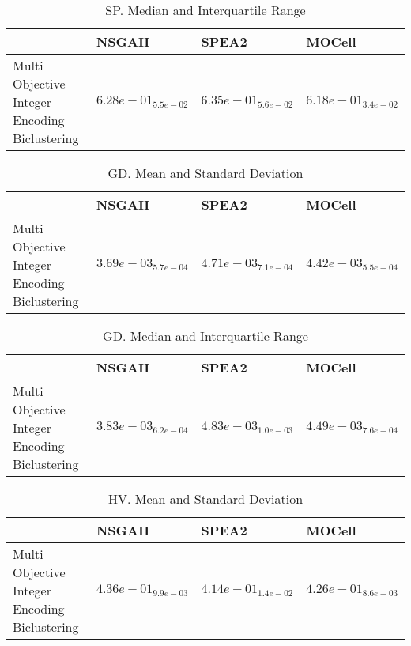 \documentclass{article}
\begin{document}
\begin{table}
\caption{SP. Median and Interquartile Range}
\label{table: SP}
\centering
\begin{scriptsize}
\begin{tabular}{llll}
\hline & NSGAII & SPEA2 &  MOCell\\
\hline 
Multi Objective Integer Encoding Biclustering & \cellcolor{gray25}$  6.28e-01_{ 5.5e-02}$ & $  6.35e-01_{ 5.6e-02}$ & \cellcolor{gray95}$  6.18e-01_{ 3.4e-02}$ \\
\hline
\end{tabular}
\end{scriptsize}
\end{table}

\begin{table}
\caption{GD. Mean and Standard Deviation}
\label{table: GD}
\centering
\begin{scriptsize}
\begin{tabular}{llll}
\hline & NSGAII & SPEA2 &  MOCell\\
\hline 
Multi Objective Integer Encoding Biclustering & \cellcolor{gray95}$  3.69e-03_{ 5.7e-04}$ & $  4.71e-03_{ 7.1e-04}$ & \cellcolor{gray25}$  4.42e-03_{ 5.5e-04}$ \\
\hline
\end{tabular}
\end{scriptsize}
\end{table}

\begin{table}
\caption{GD. Median and Interquartile Range}
\label{table: GD}
\centering
\begin{scriptsize}
\begin{tabular}{llll}
\hline & NSGAII & SPEA2 &  MOCell\\
\hline 
Multi Objective Integer Encoding Biclustering & \cellcolor{gray95}$  3.83e-03_{ 6.2e-04}$ & $  4.83e-03_{ 1.0e-03}$ & \cellcolor{gray25}$  4.49e-03_{ 7.6e-04}$ \\
\hline
\end{tabular}
\end{scriptsize}
\end{table}

\begin{table}
\caption{HV. Mean and Standard Deviation}
\label{table: HV}
\centering
\begin{scriptsize}
\begin{tabular}{llll}
\hline & NSGAII & SPEA2 &  MOCell\\
\hline 
Multi Objective Integer Encoding Biclustering & \cellcolor{gray95}$  4.36e-01_{ 9.9e-03}$ & $  4.14e-01_{ 1.4e-02}$ & \cellcolor{gray25}$  4.26e-01_{ 8.6e-03}$ \\
\hline
\end{tabular}
\end{scriptsize}
\end{table}
\end{document}
